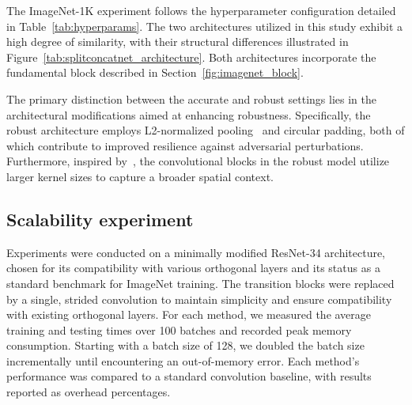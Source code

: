      The ImageNet-1K experiment follows the hyperparameter configuration detailed in Table~\ref{tab:hyperparams}. The two architectures utilized in this study exhibit a high degree of similarity, with their structural differences illustrated in Figure~\cref{tab:splitconcatnet_architecture}. Both architectures incorporate the fundamental block described in Section~\cref{fig:imagenet_block}.

    The primary distinction between the accurate and robust settings lies in the architectural modifications aimed at enhancing robustness. Specifically, the robust architecture employs L2-normalized pooling~\cite{boureau2010theoretical} and circular padding, both of which contribute to improved resilience against adversarial perturbations. Furthermore, inspired by~\cite{trockman_patches_2022}, the convolutional blocks in the robust model utilize larger kernel sizes to capture a broader spatial context.




\subsection{Scalability experiment}\label{ap:scale_xp}

    Experiments were conducted on a minimally modified ResNet-34 architecture, chosen for its compatibility with various orthogonal layers and its status as a standard benchmark for ImageNet training. The transition blocks were replaced by a single, strided convolution to maintain simplicity and ensure compatibility with existing orthogonal layers. For each method, we measured the average training and testing times over 100 batches and recorded peak memory consumption. Starting with a batch size of 128, we doubled the batch size incrementally until encountering an out-of-memory error. Each method’s performance was compared to a standard convolution baseline, with results reported as overhead percentages.

